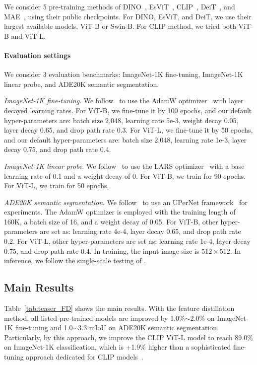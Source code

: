 \documentclass{article}
\begin{document}
We consider 5 pre-training methods of DINO~\cite{caron2021emerging}, EsViT~\cite{li2021esvit}, CLIP~\cite{radford2021clip}, DeiT~\cite{touvron2020deit}, and MAE~\cite{MaskedAutoencoders2021}, using their public checkpoints. For DINO, EsViT, and DeiT, we use their largest available models, ViT-B or Swin-B. For CLIP method, we tried both ViT-B and ViT-L.

\paragraph{Evaluation settings}

We consider 3 evaluation benchmarks: ImageNet-1K fine-tuning, ImageNet-1K linear probe, and ADE20K semantic segmentation.

\noindent \emph{ImageNet-1K fine-tuning}. We follow~\cite{bao2021beit} to use the AdamW optimizer~\cite{kingma2014adam} with layer decayed learning rates. For ViT-B, we fine-tune it by 100 epochs, and our default hyper-parameters are: batch size 2,048, learning rate 5e-3, weight decay 0.05, layer decay 0.65, and drop path rate 0.3. For ViT-L, we fine-tune it by 50 epochs, and our default hyper-parameters are: batch size 2,048, learning rate 1e-3, layer decay 0.75, and drop path rate 0.4.

\noindent \emph{ImageNet-1K linear probe}. We follow~\cite{MaskedAutoencoders2021} to use the LARS optimizer~\cite{you2017large} with a base learning rate of 0.1 and a weight decay of 0. For ViT-B, we train for 90 epochs. For ViT-L, we train for 50 epochs.

\noindent \emph{ADE20K semantic segmentation}. We follow~\cite{liu2021swin} to use an UPerNet framework~\cite{xiao2018upernet} for experiments. The AdamW \cite{kingma2014adam} optimizer is employed with the training length of 160K, a batch size of 16, and a weight decay of 0.05. For ViT-B, other hyper-parameters are set as: learning rate 4e-4, layer decay 0.65, and drop path rate 0.2. For ViT-L, other hyper-parameters are set as: learning rate 1e-4, layer decay 0.75, and drop path rate 0.4. In training, the input image size is $512\times 512$. In inference, we follow the single-scale testing of 
\cite{liu2021swin}.

\subsection{Main Results}

Table~\ref{tab:teaser_FD} shows the main results. With the feature distillation method, all listed pre-trained models are improved by 1.0\%$\sim$2.0\% on ImageNet-1K fine-tuning and 1.0$\sim$3.3 mIoU on ADE20K semantic segmentation. Particularly, by this approach, we improve the CLIP ViT-L model to reach 89.0\% on ImageNet-1K classification, which is +1.9\% higher than a sophisticated fine-tuning approach dedicated for CLIP models~\cite{ftclip2021}. 
\end{document}
